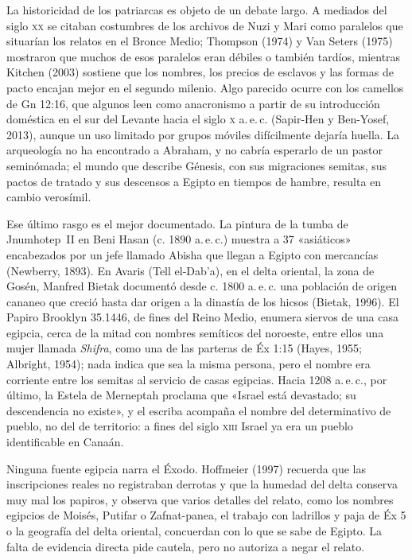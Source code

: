 La historicidad de los patriarcas es objeto de un debate largo. A mediados del siglo \textsc{xx} se citaban costumbres de los archivos de Nuzi y Mari como paralelos que situarían los relatos en el Bronce Medio; Thompson (1974) y Van Seters (1975) mostraron que muchos de esos paralelos eran débiles o también tardíos, mientras Kitchen (2003) sostiene que los nombres, los precios de esclavos y las formas de pacto encajan mejor en el segundo milenio. Algo parecido ocurre con los camellos de Gn 12:16, que algunos leen como anacronismo a partir de su introducción doméstica en el sur del Levante hacia el siglo \textsc{x} a.\,e.\,c. (Sapir-Hen y Ben-Yosef, 2013), aunque un uso limitado por grupos móviles difícilmente dejaría huella. La arqueología no ha encontrado a Abraham, y no cabría esperarlo de un pastor seminómada; el mundo que describe Génesis, con sus migraciones semitas, sus pactos de tratado y sus descensos a Egipto en tiempos de hambre, resulta en cambio verosímil.

Ese último rasgo es el mejor documentado. La pintura de la tumba de Jnumhotep~II en Beni Hasan (c. 1890 a.\,e.\,c.) muestra a 37 «asiáticos» encabezados por un jefe llamado Abisha que llegan a Egipto con mercancías (Newberry, 1893). En Avaris (Tell el-Dab\textquoteright a), en el delta oriental, la zona de Gosén, Manfred Bietak documentó desde c. 1800 a.\,e.\,c. una población de origen cananeo que creció hasta dar origen a la dinastía de los hicsos (Bietak, 1996). El Papiro Brooklyn 35.1446, de fines del Reino Medio, enumera siervos de una casa egipcia, cerca de la mitad con nombres semíticos del noroeste, entre ellos una mujer llamada \emph{Shifra}, como una de las parteras de Éx 1:15 (Hayes, 1955; Albright, 1954); nada indica que sea la misma persona, pero el nombre era corriente entre los semitas al servicio de casas egipcias. Hacia 1208 a.\,e.\,c., por último, la Estela de Merneptah proclama que «Israel está devastado; su descendencia no existe», y el escriba acompaña el nombre del determinativo de pueblo, no del de territorio: a fines del siglo \textsc{xiii} Israel ya era un pueblo identificable en Canaán.

Ninguna fuente egipcia narra el Éxodo. Hoffmeier (1997) recuerda que las inscripciones reales no registraban derrotas y que la humedad del delta conserva muy mal los papiros, y observa que varios detalles del relato, como los nombres egipcios de Moisés, Putifar o Zafnat-panea, el trabajo con ladrillos y paja de Éx 5 o la geografía del delta oriental, concuerdan con lo que se sabe de Egipto. La falta de evidencia directa pide cautela, pero no autoriza a negar el relato.

